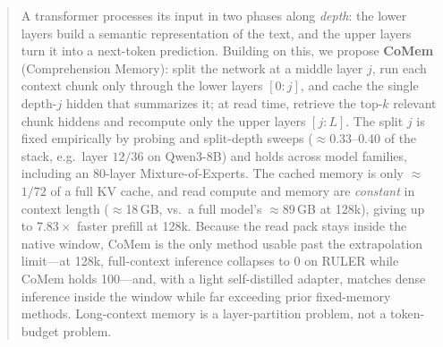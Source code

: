 \begin{abstract}
A transformer processes its input in two phases along \emph{depth}: the lower
layers build a semantic representation of the text, and the upper layers turn it
into a next-token prediction. Building on this, we propose \textbf{CoMem}
(Comprehension Memory): split the network at a middle layer $j$, run each context
chunk only through the lower layers $[0{:}j]$, and cache the single depth-$j$
hidden that summarizes it; at read time, retrieve the top-$k$ relevant chunk
hiddens and recompute only the upper layers $[j{:}L]$. The split $j$ is fixed
empirically by probing and split-depth sweeps ($\approx$$0.33$--$0.40$ of the
stack, e.g.\ layer $12/36$ on Qwen3-8B) and holds across model families,
including an 80-layer Mixture-of-Experts. The cached memory is only
$\approx$$1/72$ of a full KV cache, and read compute and memory are
\emph{constant} in context length ($\approx$18\,GB, vs.\ a full model's
$\approx$89\,GB at 128k), giving up to $7.83\times$ faster prefill at 128k.
Because the read pack stays inside the native
window, CoMem is the only method usable past the extrapolation limit---at 128k,
full-context inference collapses to 0 on RULER while CoMem holds 100---and, with
a light self-distilled adapter, matches dense inference inside the window while
far exceeding prior fixed-memory methods. Long-context memory is a
layer-partition problem, not a token-budget problem.
\end{abstract}
